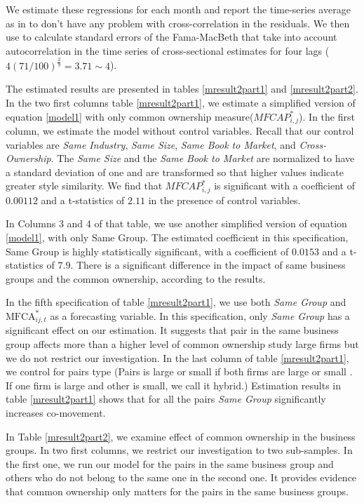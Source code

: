 \begin{LTR}
	We estimate these regressions for each month and report the time-series average as in \cite{FamaMacBeth} to don't have any problem with cross-correlation in the residuals. We then use  \cite{newey1987hypothesis} to calculate standard errors of the Fama-MacBeth that take into account autocorrelation in the time series of cross-sectional estimates for four lags ($ 4(71/100)^{\frac{2}{9}} = 3.71 \sim 4 $).
	
	The estimated results are presented in tables \ref{mresult2part1}
	and \ref{mresult2part2}.
	In the two first columns table \ref{mresult2part1}, we estimate a simplified version of equation \ref{model1} with only common ownership measure($ MFCAP^*_{i,j}$). In the first column, we estimate the model without control variables. Recall that our control variables are \textit{Same Industry}, \textit{Same Size}, \textit{Same Book to Market}, and \textit{Cross-Ownership}. The \textit{Same Size} and the \textit{Same Book to Market} are normalized to have a standard deviation of one and are transformed so that higher values indicate greater style similarity.  We find that $ MFCAP^*_{i,j}$ is significant with a coefficient of $0.00112$ and a t-statistics of $2.11$ in the presence of control variables. 
	
	
	In Columns 3 and 4 of that table, we use another simplified version of equation \ref{model1}, with only Same Group. The estimated coefficient in this specification, Same Group is highly statistically significant, with a coefficient of   $0.0153$ and a t-statistics of $7.9$. 
	There is a significant difference in the impact of same business groups and the common ownership, according to the results. 
	
	In the fifth specification of table \ref{mresult2part1}, we use both \textit{Same Group}  and $\text{MFCA}^*_{ij,t}$ as a forecasting variable. In this specification, only  \textit{Same Group} has a significant effect on our estimation. It suggests that pair in the same business group affects more than a higher level of common ownership
	\cite{AntonPolk} study large firms but we do not restrict  our investigation. In the last column of table \ref{mresult2part1}, we control for pairs type (Pairs is large or small if both firms are large or  small . If one firm is large and other is small, we call it hybrid.) Estimation results in table \ref{mresult2part1} shows that for all the pairs \textit{Same Group} significantly increases co-movement.
	
	In Table  \ref{mresult2part2}, we examine effect of common ownership in the business groups. In two first columns, we restrict our investigation to two sub-samples. In the first one, we run our model for the pairs in the same business group and others who do not belong to the same one in the second one. It provides evidence that common ownership only matters for the pairs in the same business groups. 
	

\end{LTR}
